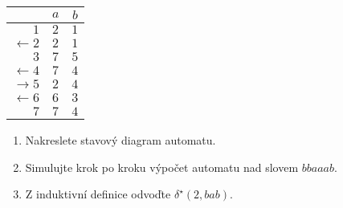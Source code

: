 \begin{multicols}{2}

\begin{tabular}{|r|c|c|}
    \hline
    & $a$ & $b$\\
    \hline
    \hline
    $1$            & $2$   & $1$\\
    $\leftarrow 2$ & $2$   & $1$\\
    $3$            & $7$   & $5$\\
    $\leftarrow 4$ & $7$   & $4$\\
    $\rightarrow 5$& $2$   & $4$\\
    $\leftarrow 6$ & $6$   & $3$\\
    $ 7$           & $7$   & $4$\\
    \hline
\end{tabular}

\columnbreak

\begin{enumerate}[noitemsep]
    \item Nakreslete stavový diagram automatu.
    \item Simulujte krok po kroku výpočet automatu nad slovem $bbaaab$.
    \item Z induktivní definice odvoďte $\delta^\star(2, bab)$.
\end{enumerate}

\end{multicols}

